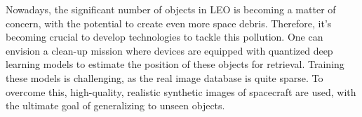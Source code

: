 
\pagestyle{fancy}
\fancyhf{} %
\fancyfoot[C]{\small\thepage} %
\renewcommand{\headrulewidth}{0pt} %
\renewcommand{\footrulewidth}{0.4pt} %

\vspace*{20mm}

\begin{center}
    {\textbf{\large \abstractname} }
\end{center}

\noindent Nowadays, the significant number of objects in \ac{LEO} is becoming a matter of concern, with the potential to create even more space debris. Therefore, it's becoming crucial to develop technologies to tackle this pollution. One can envision a clean-up mission where devices are equipped with quantized deep learning models to estimate the position of these objects for retrieval. Training these models is challenging, as the real image database is quite sparse. To overcome this, high-quality, realistic synthetic images of spacecraft are used, with the ultimate goal of generalizing to unseen objects.